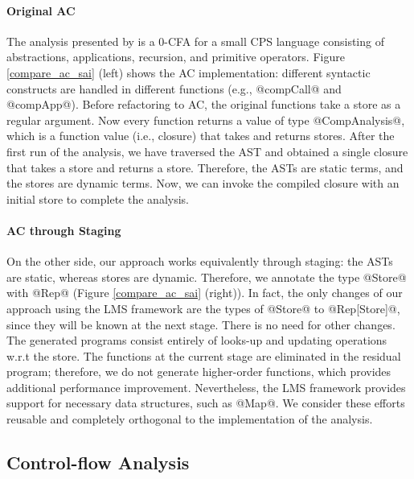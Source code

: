\paragraph{Original AC}
The analysis presented by \citeauthor{Boucher:1996:ACN:647473.727587} is a 0-CFA
for a small CPS language consisting of abstractions, applications, recursion, and
primitive operators. Figure \ref{compare_ac_sai} (left) shows the AC
implementation: different syntactic constructs are handled in different functions
(e.g., @compCall@ and @compApp@).
Before refactoring to AC, the original functions take a store as a
regular argument. Now every function returns a value of type @CompAnalysis@,
which is a function value (i.e., closure) that takes and returns stores. After the
first run of the analysis, we have traversed the AST and obtained a single closure that
takes a store and returns a store. Therefore, the ASTs are static terms, and the
stores are dynamic terms. Now, we can invoke the compiled closure with an initial
store to complete the analysis.

\paragraph{AC through Staging}

On the other side, our approach works equivalently through staging: the ASTs
are static, whereas stores are dynamic. Therefore, we annotate the type @Store@
with @Rep@ (Figure \ref{compare_ac_sai} (right)). In fact, the only changes of
our approach using the LMS framework are the types of @Store@ to @Rep[Store]@,
since they will be known at the next stage. There is no need for other changes.
The generated programs consist entirely of looks-up and updating operations
w.r.t the store.  The functions at the current stage are eliminated in the
residual program; therefore, we do not generate higher-order functions, which
provides additional performance improvement. Nevertheless, the LMS framework
provides support for necessary data structures, such as @Map@.  We consider
these efforts reusable and completely orthogonal to the implementation of the
analysis.

\subsection{Control-flow Analysis} \label{cfa}

